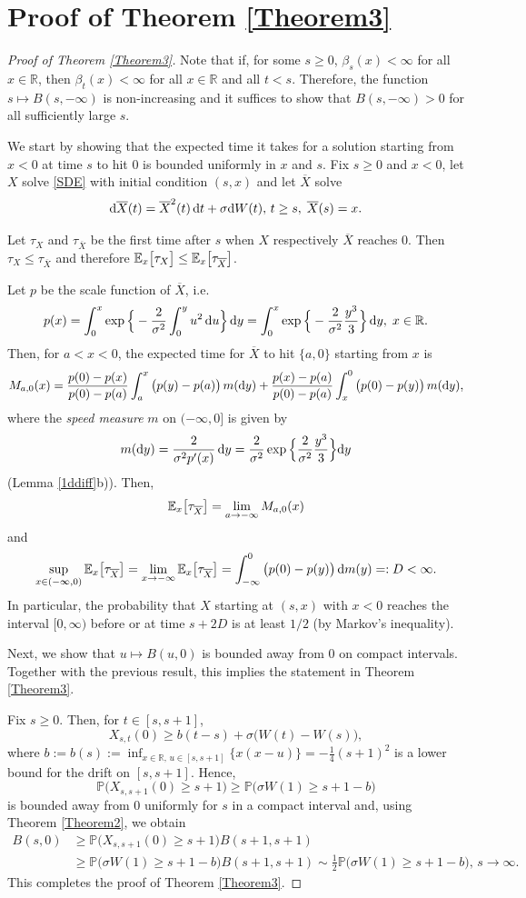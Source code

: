 \documentclass[sn-mathphys-num]{sn-jnl}
\theoremstyle{definition}
\newcommand{\scr}[1]{\mathscr #1}
\numberwithin{equation}{section} \theoremstyle{remark}
\renewcommand{\d}{\hbox{d}}
\def\R{\mathbb R}
\def\d{\text{\rm{d}}} \def\bb{\beta} \def\aa{\alpha} \def\D{\scr D}
\def\P{\mathbb P}
\newcommand{\1}{\mathbbm{1}}
\renewcommand{\bar}{\overline}
\begin{document}
  \section{Proof of Theorem \ref{Theorem3}}
  \begin{proof}[Proof of Theorem \ref{Theorem3}] Note that if, for some $s \geq 0$, $\beta_s(x)<\infty$ for all $x \in \R$, then  $\beta_t(x)<\infty$ for all $x \in \R$ and all $t <s$. Therefore, the function $s \mapsto B(s,-\infty)$ is non-increasing and it suffices to show that $B(s,-\infty)>0$ for all sufficiently large $s$.

 We start by showing that the expected time it takes for a solution starting from $x<0$ at time $s$ to hit 0 is bounded uniformly in $x$ and $s$.   Fix $s\geq 0$ and $x <0$, let $X$ solve \eqref{SDE} with initial condition $(s,x)$ and let $\bar X$ solve
    $$
\d \bar X(t)= \bar X^2(t)\,\d t+\sigma \d W(t),\,t \geq s, \;\bar X(s)=x.
$$

Let $\tau_X$ and $\tau_{\bar X}$ be the first time after $s$ when $X$ respectively $\bar X$ reaches 0. Then $\tau_X\leq \tau_{\bar X}$ and therefore $\E_x\big[\tau_X\big]\leq \E_x\big[\tau_{\bar X}\big]$.

Let $p$ be the scale function of $\bar X$, i.e.
$$
p(x)=\int_0^x\exp\Big\{-\frac 2{\sigma^2}\int_0^y u^2\,\d u\Big\}\,\d y=\int_0^x\exp\Big\{-\frac 2{\sigma^2} \frac{y^3}3\Big\}\,\d y,\; x \in \R.
$$
Then, for $a<x<0$, the expected time for $\bar X$ to hit $\{a,0\}$ starting from $x$ is
$$
M_{a,0}(x)=\frac{p(0)-p(x)}{p(0)-p(a)} \int_a^x\big(p(y)-p(a)\big)\,m(\d y)+\frac{p(x)-p(a)}{p(0)-p(a)} \int_x^0\big(p(0)-p(y)\big)\,m(\d y),
$$
where the {\em speed measure} $m$ on $(-\infty,0]$ is given by
$$
m(\d y)=\frac 2{\sigma^2p'(x)}\,\d y= \frac 2{\sigma^2}\exp\Big\{ \frac 2{\sigma^2} \frac {y^3}3\Big\}\d y 
$$
(Lemma \ref{1ddiff}b)). Then,
$$
\E_x\big[\tau_{\bar X}\big]=\lim_{a \to -\infty}M_{a,0}(x)
$$
and
$$
\sup_{x \in (-\infty,0)}\E_x\big[\tau_{\bar X}\big]=\lim_{x \to -\infty}\E_x\big[\tau_{\bar X}\big]=\int_{-\infty}^0\big(p(0)-p(y)\big)\,\d m(y)=:D<\infty.
$$
In particular, the probability that $X$ starting at $(s,x)$ with $x<0$ reaches the interval $[0,\infty)$ before or at time $s+2D$ is at least $1/2$ (by Markov's inequality).

Next, we show that $u \mapsto B(u,0)$ is bounded away from 0 on compact intervals. Together with the previous result, this implies the statement in Theorem \ref{Theorem3}.

Fix $s \geq 0$. Then, for $t \in [s,s+1]$,
$$
X_{s,t}(0)\geq b(t-s) + \sigma \big(W(t)-W(s)\big),
$$
where $b:=b(s):=\inf_{x \in \R,\, u\in [s,s+1]}\{x(x-u)\}=-\frac 14(s+1)^2$ is a lower bound for the drift on $[s,s+1]$. Hence,
$$
\P\big( X_{s,s+1}(0)\geq s+1\big) \geq \P\big(\sigma W(1)\geq s+1-b\big)
$$
is bounded away from 0 uniformly for $s$ in a compact interval and, using Theorem \ref{Theorem2}, we obtain
\begin{align*}
B(s,0)&\geq \P\big( X_{s,s+1}(0)\geq s+1\big) B(s+1,s+1)\\
&\geq  \P\big(\sigma W(1)\geq s+1-b\big)  B(s+1,s+1) \sim \frac 12 \P\big(\sigma W(1)\geq s+1-b\big),\,s \to \infty.
\end{align*}
This completes the proof of Theorem \ref{Theorem3}.
    \end{proof}
\end{document}
